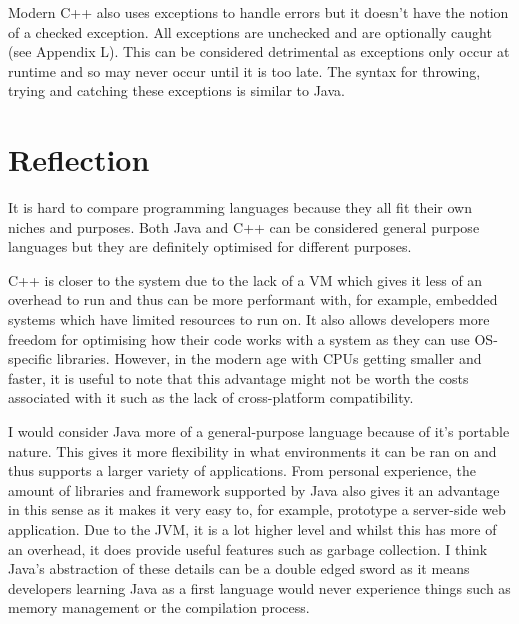 \documentclass[]{report}
\begin{document}
Modern C++ also uses exceptions to handle errors but it doesn't have the notion of a checked exception. All exceptions are unchecked and are optionally caught (see Appendix L). This can be considered detrimental as exceptions only occur at runtime and so may never occur until it is too late. The syntax for throwing, trying and catching these exceptions is similar to Java.\cite{ExceptionsC++}

\section{Reflection}

It is hard to compare programming languages because they all fit their own niches and purposes. Both Java and C++ can be considered general purpose languages but they are definitely optimised for different purposes. 

C++ is closer to the system due to the lack of a VM which gives it less of an overhead to run and thus can be more performant with, for example, embedded systems which have limited resources to run on. It also allows developers more freedom for optimising how their code works with a system as they can use OS-specific libraries. However, in the modern age with CPUs getting smaller and faster, it is useful to note that this advantage might not be worth the costs associated with it such as the lack of cross-platform compatibility.

I would consider Java more of a general-purpose language because of it's portable nature. This gives it more flexibility in what environments it can be ran on and thus supports a larger variety of applications. From personal experience, the amount of libraries and framework supported by Java also gives it an advantage in this sense as it makes it very easy to, for example, prototype a server-side web application. Due to the JVM, it is a lot higher level and whilst this has more of an overhead, it does provide useful features such as garbage collection. I think Java's abstraction of these details can be a double edged sword as it means developers learning Java as a first language would never experience things such as memory management or the compilation process.
\end{document}
